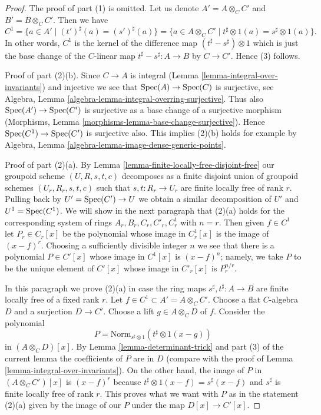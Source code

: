 \begin{proof}
The proof of part (1) is omitted. Let us denote $A' = A \otimes_C C'$ and
$B' = B \otimes_C C'$. Then we have
$$
C^1
= \{a \in A' \mid (t')^\sharp(a) = (s')^\sharp(a) \}
= \{a \in A \otimes_C C' \mid t^\sharp \otimes 1(a) = s^\sharp \otimes 1(a) \}.
$$
In other words, $C^1$ is the kernel of the difference map
$(t^\sharp - s^\sharp) \otimes 1$ which is just the base change
of the $C$-linear map $t^\sharp - s^\sharp : A \to B$ by $C \to C'$.
Hence (3) follows.

\medskip\noindent
Proof of part (2)(b). Since $C \to A$ is integral
(Lemma \ref{lemma-integral-over-invariants}) and injective we see that
$\mathop{\mathrm{Spec}}(A) \to \mathop{\mathrm{Spec}}(C)$ is surjective, see
Algebra, Lemma \ref{algebra-lemma-integral-overring-surjective}.
Thus also $\mathop{\mathrm{Spec}}(A') \to \mathop{\mathrm{Spec}}(C')$ is surjective
as a base change of a surjective morphism
(Morphisms, Lemma \ref{morphisms-lemma-base-change-surjective}).
Hence $\mathop{\mathrm{Spec}}(C^1) \to \mathop{\mathrm{Spec}}(C')$ is surjective also.
This implies (2)(b) holds for example by
Algebra, Lemma \ref{algebra-lemma-image-dense-generic-points}.

\medskip\noindent
Proof of part (2)(a). By Lemma \ref{lemma-finite-locally-free-disjoint-free}
our groupoid scheme $(U, R, s, t, c)$ decomposes as a finite disjoint union
of groupoid schemes $(U_r, R_r, s, t, c)$ such that $s, t : R_r \to U_r$
are finite locally free of rank $r$. Pulling back by $U' = \mathop{\mathrm{Spec}}(C') \to U$
we obtain a similar decomposition of $U'$ and $U^1 = \mathop{\mathrm{Spec}}(C^1)$.
We will show in the next paragraph that (2)(a) holds for the corresponding
system of rings $A_r, B_r, C_r, C'_r, C^1_r$ with $n = r$.
Then given $f \in C^1$ let $P_r \in C_r[x]$ be the polynomial
whose image in $C^1_r[x]$ is the image of $(x - f)^r$.
Choosing a sufficiently divisible integer $n$ we see that
there is a polynomial $P \in C'[x]$ whose image in $C^1[x]$ is
$(x - f)^n$; namely, we take $P$ to be the unique element of
$C'[x]$ whose image in $C'_r[x]$ is $P_r^{n/r}$.

\medskip\noindent
In this paragraph we prove (2)(a) in case the ring maps
$s^\sharp, t^\sharp : A \to B$ are finite locally free of a fixed rank $r$.
Let $f \in C^1 \subset A' = A \otimes_C C'$. Choose a flat
$C$-algebra $D$ and a surjection $D \to C'$. Choose a lift
$g \in A \otimes_C D$ of $f$.
Consider the polynomial
$$
P = \text{Norm}_{s^\sharp \otimes 1}(t^\sharp \otimes 1(x - g))
$$
in $(A \otimes_C D)[x]$. By Lemma \ref{lemma-determinant-trick}
and part (3) of the current lemma the coefficients of $P$ are in $D$
(compare with the proof of Lemma \ref{lemma-integral-over-invariants}).
On the other hand, the image of $P$ in $(A \otimes_C C')[x]$ is
$(x - f)^r$ because $t^\sharp \otimes 1(x - f) = s^\sharp(x - f)$
and $s^\sharp$ is finite locally free of rank $r$.
This proves what we want with $P$ as in the statement (2)(a)
given by the image of our $P$ under the map $D[x] \to C'[x]$.
\end{proof}

